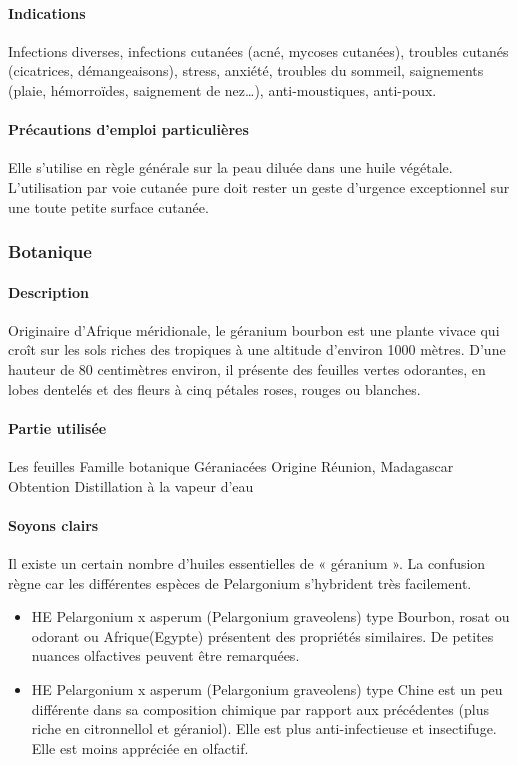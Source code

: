 \documentclass[12pt,a4wide]{article}
\begin{document}
\paragraph{Indications}
\label{sec-4-6-1-3}
Infections diverses, infections cutanées (acné, mycoses cutanées), troubles cutanés (cicatrices, démangeaisons), stress, anxiété, troubles du sommeil, saignements (plaie, hémorroïdes, saignement de nez…), anti-moustiques, anti-poux.

\paragraph{Précautions d'emploi particulières}
\label{sec-4-6-1-4}
Elle s'utilise en règle générale sur la peau diluée dans une huile végétale.
L'utilisation par voie cutanée pure doit rester un geste d'urgence exceptionnel sur une toute petite surface cutanée.



\subsubsection{Botanique}
\label{sec-4-6-2}

\paragraph{Description}
\label{sec-4-6-2-1}
Originaire d'Afrique méridionale, le géranium bourbon est une plante vivace qui croît sur les sols riches des tropiques à une altitude d'environ 1000 mètres. D'une hauteur de 80 centimètres environ, il présente des feuilles vertes odorantes, en lobes dentelés et des fleurs à cinq pétales roses, rouges ou blanches.
\paragraph{Partie utilisée}
\label{sec-4-6-2-2}
Les feuilles
Famille botanique
Géraniacées
Origine
Réunion, Madagascar
Obtention
Distillation à la vapeur d'eau

\paragraph{Soyons clairs}
\label{sec-4-6-2-3}
Il existe un certain nombre d'huiles essentielles de « géranium ». La confusion règne car les différentes espèces de Pelargonium s'hybrident très facilement.
\begin{itemize}
\item HE Pelargonium x asperum (Pelargonium graveolens) type Bourbon, rosat ou odorant ou Afrique(Egypte) présentent des propriétés similaires. De petites nuances olfactives peuvent être remarquées.
\item HE Pelargonium x asperum (Pelargonium graveolens) type Chine est un peu différente dans sa composition chimique par rapport aux précédentes (plus riche en citronnellol et géraniol). Elle est plus anti-infectieuse et insectifuge. Elle est moins appréciée en olfactif.
\end{itemize}
\end{document}
